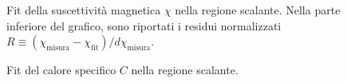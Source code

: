 \documentclass[a4paper,11pt]{article}
\begin{document}
	
	\begin{figure}
        \centering
		\caption{Fit della suscettività magnetica $\chi$ nella regione scalante. Nella parte inferiore del grafico, sono riportati i residui normalizzati $R \equiv (\chi_{\text{misura}} - \chi_\text{fit})/d\chi_\text{misura}$.}
        \label{fig:chi_fit}
	\end{figure}

	\begin{figure}
        \centering
        \caption{Fit del calore specifico $C$ nella regione scalante.}
        \label{fig:C_fit}
	\end{figure}
	
\end{document}
